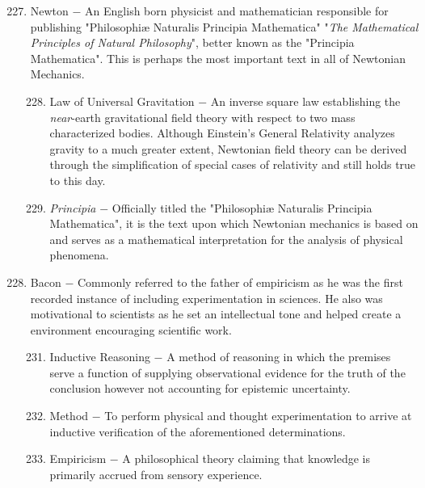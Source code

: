 \documentclass[12pt]{article}
\begin{document}
\begin{enumerate}
 
\begin{enumerate}[label=\arabic{*}.]
\setcounter{enumii}{226}

\item Newton $-$ An English born physicist and mathematician responsible for publishing "Philosophiæ Naturalis Principia Mathematica" "\textit{The Mathematical Principles of Natural Philosophy}",  better known as the "Principia Mathematica". This is perhaps the most important text in all of Newtonian Mechanics.

\begin{enumerate}[label=\arabic{*}.]
\setcounter{enumiii}{227}

\item Law of Universal Gravitation $-$ An inverse square law establishing the \textit{near}-earth gravitational field theory with respect to two mass characterized bodies. Although Einstein's General Relativity analyzes gravity to a much greater extent, Newtonian field theory can be derived through the simplification of special cases of relativity and still holds true to this day.

\item \textit{Principia} $-$ Officially titled the "Philosophiæ Naturalis Principia Mathematica", it is the text upon which Newtonian mechanics is based on and serves as a mathematical interpretation for the analysis of physical phenomena.

\end{enumerate}
\setcounter{enumii}{229}

\item Bacon $-$ Commonly referred to the father of empiricism as he was the first recorded instance of including experimentation in sciences. He also was motivational to scientists as he set an intellectual tone and helped create a environment encouraging scientific work.

\begin{enumerate}[label=\arabic{*}.]
\setcounter{enumiii}{230}

\item Inductive Reasoning $-$ A method of reasoning in which the premises serve a function of supplying observational evidence for the truth of the conclusion however not accounting for epistemic uncertainty.

\item Method $-$ To perform physical and thought experimentation to arrive at inductive verification of the aforementioned determinations.

\item Empiricism $-$ A philosophical theory claiming that knowledge is primarily accrued from sensory experience.


\end{enumerate}
\end{enumerate}
\end{enumerate}
\end{document}

